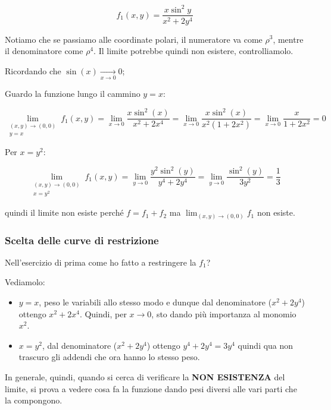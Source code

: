 \[
    f_1(x,y) = \frac{x\sin^{2}y}{x^{2}+2y^{4}}
\]

Notiamo che se passiamo alle coordinate polari, il numeratore va come \(\rho^{3}\), mentre il denominatore come \(\rho^{4}\). Il limite potrebbe quindi non esistere, controlliamolo.

Ricordando che \(\sin(x) \xrightarrow[x \to 0]{} 0\);

Guardo la funzione lungo il cammino \(y=x\):

\[
    \lim_{ \begin{smallmatrix}(x,y) \to (0,0) \\ y=x \end{smallmatrix} } f_1(x,y) = \lim_{ x \to 0 } \frac{x\sin^{2}(x)}{x^{2}+2x^{4}} = \lim_{ x \to 0 } \frac{x\sin^{2}(x)}{x^{2}(1+2x^{2})} = \lim_{ x \to 0 } \frac{x}{1+2x^2} = 0
\]

Per \(x = y^{2}\):

\[
    \lim_{ \begin{smallmatrix}(x,y) \to (0,0) \\ x=y^2 \end{smallmatrix} } f_1(x,y)  = \lim_{ y \to 0 } \frac{y^{2}\sin^{2}(y)}{y^{4}+2y^{4}} = \lim_{ y \to 0 } \frac{\sin^{2}(y)}{3y^{2}}  = \frac{1}{3}
\]

quindi il limite non esiste perché \(f= f_1+f_2\) ma \(\lim_{ (x,y) \to (0,0) } f_1\) non esiste.

\pagebreak
\subsubsection{Scelta delle curve di restrizione}

Nell'esercizio di prima come ho fatto a restringere la \(f_1\)?

Vediamolo:

\begin{itemize}
    \item \(y=x\), peso le variabili allo stesso modo e dunque dal denominatore (\(x^{2}+2y^{4}\)) ottengo \(x^{2}+2x^{4}\). Quindi, per \(x \rightarrow 0\), sto dando più importanza al monomio \(x^2\).
    \item \(x=y^{2}\), dal denominatore (\(x^{2}+2y^{4}\)) ottengo \(y^{4}+2y^{4} = 3y^{4}\) quindi qua non trascuro gli addendi che ora hanno lo stesso peso.
\end{itemize}

In generale, quindi, quando si cerca di verificare la \textbf{NON ESISTENZA} del limite, si prova a vedere cosa fa la funzione dando pesi diversi alle vari parti che la compongono.

